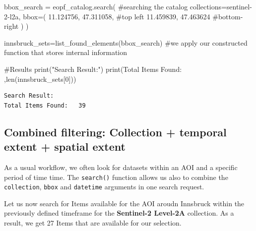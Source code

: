 \documentclass[
  letterpaper,
  DIV=11,
  numbers=noendperiod]{scrreprt}
\newenvironment{Shaded}{\begin{snugshade}}{\end{snugshade}}
\newcommand{\BuiltInTok}[1]{\textcolor[rgb]{0.00,0.23,0.31}{#1}}
\newcommand{\CommentTok}[1]{\textcolor[rgb]{0.37,0.37,0.37}{#1}}
\newcommand{\DecValTok}[1]{\textcolor[rgb]{0.68,0.00,0.00}{#1}}
\newcommand{\FloatTok}[1]{\textcolor[rgb]{0.68,0.00,0.00}{#1}}
\newcommand{\NormalTok}[1]{\textcolor[rgb]{0.00,0.23,0.31}{#1}}
\newcommand{\OperatorTok}[1]{\textcolor[rgb]{0.37,0.37,0.37}{#1}}
\newcommand{\StringTok}[1]{\textcolor[rgb]{0.13,0.47,0.30}{#1}}
\begin{document}
\begin{Shaded}
\begin{Highlighting}[]
\NormalTok{bbox\_search }\OperatorTok{=}\NormalTok{  eopf\_catalog.search(  }\CommentTok{\#searching the catalog}
\NormalTok{    collections}\OperatorTok{=}\StringTok{\textquotesingle{}sentinel{-}2{-}l2a\textquotesingle{}}\NormalTok{,}
\NormalTok{    bbox}\OperatorTok{=}\NormalTok{(}
        \FloatTok{11.124756}\NormalTok{, }\FloatTok{47.311058}\NormalTok{, }\CommentTok{\#top left}
        \FloatTok{11.459839}\NormalTok{, }\FloatTok{47.463624}  \CommentTok{\#bottom{-}right}
\NormalTok{        )}
\NormalTok{)}

\NormalTok{innsbruck\_sets}\OperatorTok{=}\NormalTok{list\_found\_elements(bbox\_search) }\CommentTok{\#we apply our constructed function that stores internal information}

\CommentTok{\#Results}
\BuiltInTok{print}\NormalTok{(}\StringTok{"Search Result:"}\NormalTok{)}
\BuiltInTok{print}\NormalTok{(}\StringTok{\textquotesingle{}Total Items Found:  \textquotesingle{}}\NormalTok{,}\BuiltInTok{len}\NormalTok{(innsbruck\_sets[}\DecValTok{0}\NormalTok{]))}
\end{Highlighting}
\end{Shaded}

\begin{verbatim}
Search Result:
Total Items Found:   39
\end{verbatim}

\subsection{Combined filtering: Collection + temporal extent + spatial
extent}\label{combined-filtering-collection-temporal-extent-spatial-extent}

As a usual workflow, we often look for datasets within an AOI and a
specific period of time time. The \texttt{search()} function allows us
also to combine the \texttt{collection}, \texttt{bbox} and
\texttt{datetime} arguments in one search request.

Let us now search for Items available for the AOI aroudn Innsbruck
within the previously defined timeframe for the \textbf{Sentinel-2
Level-2A} collection. As a result, we get 27 Items that are available
for our selection.
\end{document}
